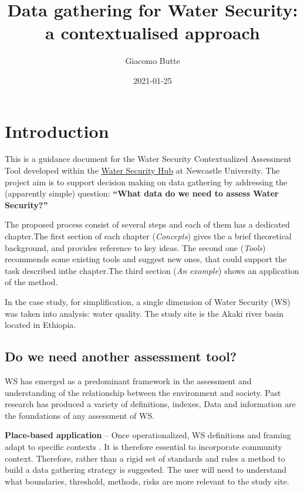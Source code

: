 \documentclass[
]{book}
\title{Data gathering for Water Security: a contextualised approach}
\author{Giacomo Butte}
\date{2021-01-25}
\begin{document}
\maketitle

{
\setcounter{tocdepth}{1}
\tableofcontents
}
\hypertarget{introduction}{%
\chapter{Introduction}\label{introduction}}

This is a guidance document for the Water Security Contextualized Assessment Tool developed within the \href{https://www.watersecurityhub.org}{Water Security Hub} at Newcastle University. The project aim is to support decision making on data gathering by addressing the (apparently simple) question: \textbf{``What data do we need to assess Water Security?''}

The proposed process consist of several steps and each of them has a dedicated chapter.The first section of each chapter (\emph{Concepts}) gives the a brief theoretical background, and provides reference to key ideas. The second one (\emph{Tools}) recommends some existing tools and suggest new ones, that could support the task described inthe chapter.The third section (\emph{An example}) shows an application of the method.

In the case study, for simplification, a single dimension of Water Security (WS) was taken into analysis: water quality. The study site is the Akaki river basin located in Ethiopia.

\hypertarget{do-we-need-another-assessment-tool}{%
\section{Do we need another assessment tool?}\label{do-we-need-another-assessment-tool}}

WS has emerged as a predominant framework in the assessment and understanding of the relationship between the environment and society. Past research has produced a variety of definitions, indexes,
Data and information are the foundations of any assessment of WS.

\textbf{Place-based application} -- Once operationalized, WS definitions and framing adapt to specific contexts \citep{Gerlak2018}. It is therefore essential to incorporate community context. Therefore, rather than a rigid set of standards and rules a method to build a data gathering strategy is suggested. The user will need to understand what boundaries, threshold, methods, risks are more relevant to the study site.
\end{document}
